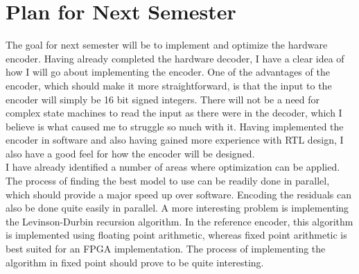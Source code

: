 \documentclass[12pt]{scrartcl}
\begin{document}
  \section{Plan for Next Semester}
  The goal for next semester will be to implement and optimize the hardware encoder. Having already completed the hardware decoder, I have a clear idea of how I will go about implementing the encoder. One of the advantages of the encoder, which should make it more straightforward, is that the input to the encoder will simply be 16 bit signed integers. There will not be a need for complex state machines to read the input as there were in the decoder, which I believe is what caused me to struggle so much with it. Having implemented the encoder in software and also having gained more experience with RTL design, I also have a good feel for how the encoder will be designed. \\
      
  I have already identified a number of areas where optimization can be applied. The process of finding the best model to use can be readily done in parallel, which should provide a major speed up over software. Encoding the residuals can also be done quite easily in parallel. A more interesting problem is implementing the Levinson-Durbin recursion algorithm. In the reference encoder, this algorithm is implemented using floating point arithmetic, whereas fixed point arithmetic is best suited for an FPGA implementation. The process of implementing the algorithm in fixed point should prove to be quite interesting.
  
  
  
\end{document}
